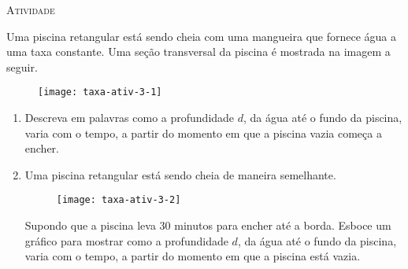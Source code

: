 \documentclass[10 pt,usenames,dvipsnames, oneside]{article}
\begin{document}
\bigskip
\begin{center}
{\large \scshape Atividade}
\end{center}
\fi

Uma piscina retangular está sendo cheia com uma mangueira que fornece água a uma taxa constante. Uma seção transversal da piscina é mostrada na imagem a seguir.

\begin{figure}[H]
\centering
\texttt{[image: taxa-ativ-3-1]}
\end{figure}

\begin{enumerate}
\item Descreva em palavras como a profundidade $d$, da água até o fundo da piscina, varia com o tempo, a partir do momento em que a piscina vazia começa a encher.
\item Uma piscina retangular está sendo cheia de maneira semelhante.

\begin{figure}[H]
\centering
\texttt{[image: taxa-ativ-3-2]}

\end{figure}

Supondo que a piscina leva 30 minutos para encher até a borda. Esboce um gráfico para mostrar como a profundidade $d$, da água até o fundo da piscina, varia com o tempo, a partir do momento em que a piscina está vazia.

\begin{figure}[H]
\centering

\end{figure}
\end{enumerate}

\ifdefined\prof
\end{document}
